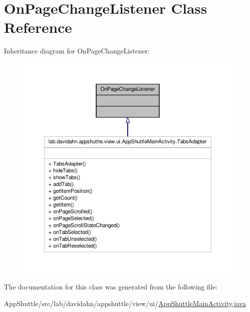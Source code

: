 \hypertarget{class_view_pager_1_1_on_page_change_listener}{\section{\-On\-Page\-Change\-Listener \-Class \-Reference}
\label{class_view_pager_1_1_on_page_change_listener}
}


\-Inheritance diagram for \-On\-Page\-Change\-Listener\-:
\nopagebreak
\begin{figure}[H]
\begin{center}
\leavevmode
\includegraphics[width=350pt]{class_view_pager_1_1_on_page_change_listener__inherit__graph}
\end{center}
\end{figure}


\-The documentation for this class was generated from the following file\-:\begin{DoxyCompactItemize}
\item 
\-App\-Shuttle/src/lab/davidahn/appshuttle/view/ui/\hyperlink{_app_shuttle_main_activity_8java}{\-App\-Shuttle\-Main\-Activity.\-java}\end{DoxyCompactItemize}
